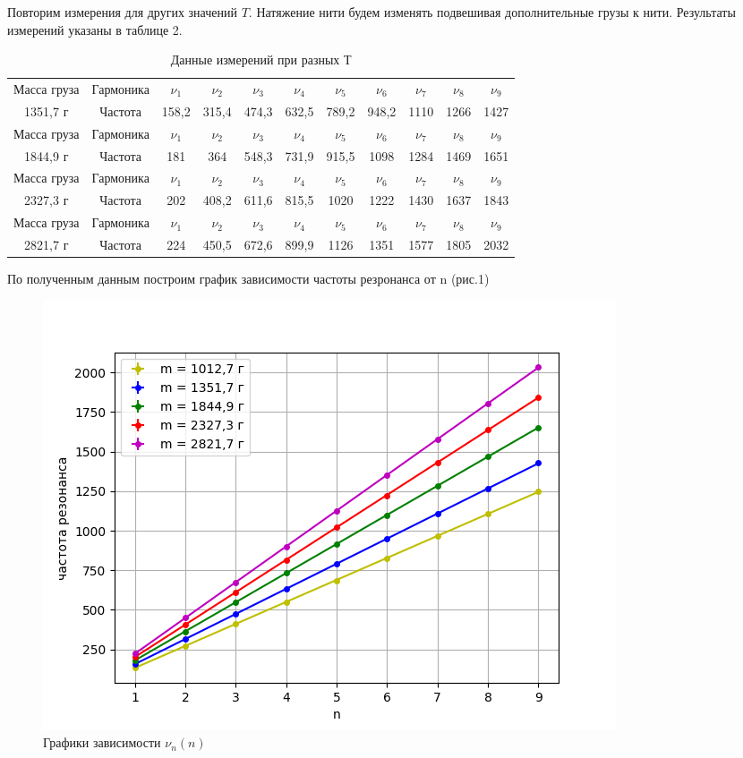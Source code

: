 \documentclass{article}
\begin{document}
Повторим измерения для других значений $T$. Натяжение нити будем изменять подвешивая дополнительные грузы к нити. Результаты измерений указаны в таблице 2.

\begin{table}[h]
    \centering
    \begin{tabular}{|c|c|c|c|c|c|c|c|c|c|c|}
    \hline
         Масса груза & Гармоника & $\nu_1$ &  $\nu_2$ &  $\nu_3$ &  $\nu_4$ &  $\nu_5$ &  $\nu_6$ &  $\nu_7$ &  $\nu_8$ &  $\nu_9$ \\
         1351,7 г & Частота & 158,2 & 315,4 & 474,3 & 632,5 & 789,2 & 948,2 & 1110 & 1266 & 1427 \\
    \hline
         Масса груза & Гармоника & $\nu_1$ &  $\nu_2$ &  $\nu_3$ &  $\nu_4$ &  $\nu_5$ &  $\nu_6$ &  $\nu_7$ &  $\nu_8$ &  $\nu_9$ \\
         1844,9 г & Частота & 181 & 364 & 548,3 & 731,9 & 915,5 & 1098 & 1284 & 1469 & 1651 \\
    \hline
         Масса груза & Гармоника & $\nu_1$ &  $\nu_2$ &  $\nu_3$ &  $\nu_4$ &  $\nu_5$ &  $\nu_6$ &  $\nu_7$ &  $\nu_8$ &  $\nu_9$ \\
         2327,3 г & Частота & 202 & 408,2 & 611,6 & 815,5 & 1020 & 1222 & 1430 & 1637 & 1843 \\
    \hline
         Масса груза & Гармоника & $\nu_1$ &  $\nu_2$ &  $\nu_3$ &  $\nu_4$ &  $\nu_5$ &  $\nu_6$ &  $\nu_7$ &  $\nu_8$ &  $\nu_9$ \\
         2821,7 г & Частота & 224 & 450,5 & 672,6 & 899,9 & 1126 & 1351 & 1577 & 1805 & 2032 \\
    \hline
    \end{tabular}
    \caption{Данные измерений при разных Т}
\end{table}

По полученным данным построим график зависимости частоты резронанса от n (рис.1)

\begin{figure}[h]
    \centering
    \includegraphics[width=1\linewidth]{5 lines.png}
    \caption{Графики зависимости $\nu_n(n)$}
\end{figure}
\end{document}
